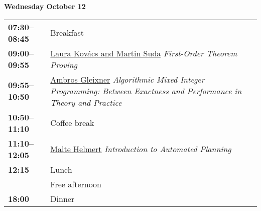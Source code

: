 \documentclass[11pt]{article}
\newcommand{\scheduletablewidth}{5.06in}
\begin{document}
\noindent\begin{minipage}{\textwidth}
\begin{center} {\bf\large Wednesday October 12} \end{center}
\begin{tabular}{ p{0.9in} p{\scheduletablewidth} }

{\bf 07:30--08:45} & Breakfast \\

{\bf 09:00--09:55} & \hyperref[Kovacs]{Laura Kovács and Martin Suda}
{\em First-Order Theorem Proving} \\

{\bf 09:55--10:50} & \hyperref[Gleixner]{Ambros Gleixner}
{\em Algorithmic Mixed Integer Programming: Between Exactness and Performance in Theory and Practice} \\

{\bf 10:50--11:10} & Coffee break \\

{\bf 11:10--12:05} & \hyperref[Helmert]{Malte Helmert}
{\em Introduction to Automated Planning} \\

{\bf 12:15%
} & Lunch\\
{\bf } & Free afternoon \\
{\bf 18:00} & Dinner \\
\end{tabular}
\end{minipage}
\end{document}
